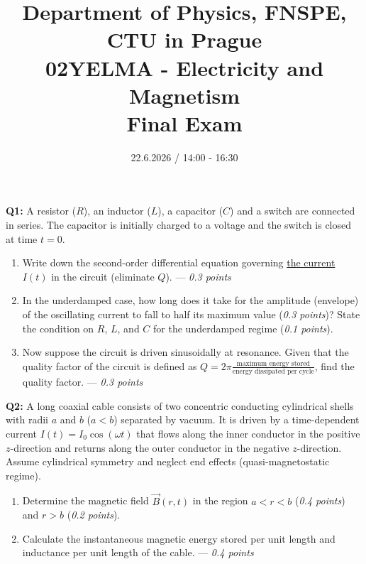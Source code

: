 \documentclass[a4paper,12pt]{article}
\title{{\large Department of Physics, FNSPE, CTU in Prague} \\
                  02YELMA - Electricity and Magnetism \\ 
          {\Large \textbf{Final Exam}}\vspace{-1cm}}
\date{22.6.2026 / 14:00 - 16:30}
\author{}
\begin{document}
\maketitle
\vspace{-0.8cm}

\noindent

\vspace{0pt}
\textbf{Q1:} A resistor ($R$), an inductor ($L$), a capacitor ($C$) and a switch are connected in series. The capacitor is initially charged to a voltage and the switch is closed at time $t=0$.
\begin{enumerate}
    \item[(a)] Write down the second-order differential equation governing \underline{the current} $I(t)$ in the circuit (eliminate $Q$). --- \emph{0.3 points}
    \item[(b)] In the underdamped case, how long does it take for the amplitude (envelope) of the oscillating current to fall to half its maximum value (\emph{0.3 points})? State the condition on $R$, $L$, and $C$ for the underdamped regime (\emph{0.1 points}).
    \item[(c)] Now suppose the circuit is driven sinusoidally at resonance. Given that the quality factor of the circuit is defined as $Q=2\pi \frac{\text{maximum energy stored}}{\text{energy dissipated per cycle}}$, find the quality factor. --- \emph{0.3 points}
\end{enumerate}

\vspace*{0.3cm}
\textbf{Q2:} A long coaxial cable consists of two concentric conducting cylindrical shells with radii $a$ and $b$ ($a < b$) separated by vacuum. It is driven by a time-dependent current $I(t) = I_0 \cos(\omega t)$ that flows along the inner conductor in the positive $z$-direction and returns along the outer conductor in the negative $z$-direction. Assume cylindrical symmetry and neglect end effects (quasi-magnetostatic regime). 
\begin{enumerate}
    \item[(a)] Determine the magnetic field $\vec{B}(r,t)$ in the region $a < r < b$ (\emph{0.4 points}) and $r > b$ (\emph{0.2 points}).
    \item[(b)] Calculate the instantaneous magnetic energy stored per unit length and inductance per unit length of the cable. --- \emph{0.4 points}
\end{enumerate}
\end{document}
